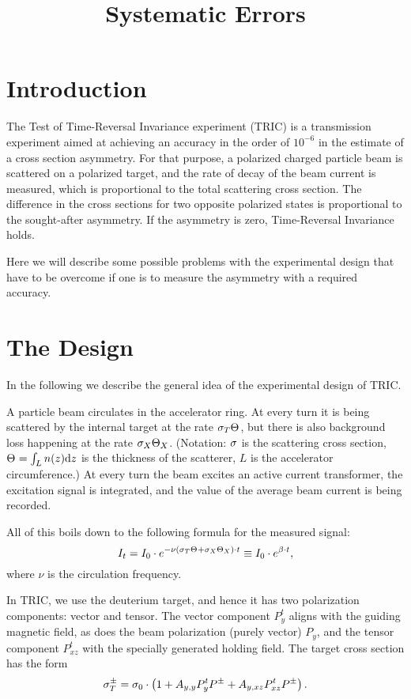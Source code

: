 \documentclass{article}
\begin{document}
\title{Systematic Errors}
\maketitle

\section{Introduction}

The Test of Time-Reversal Invariance experiment (TRIC) is a transmission experiment aimed at achieving an accuracy in the order of $10^{-6}$ in the estimate of a cross section asymmetry. For that purpose, a polarized charged particle beam is scattered on a polarized target, and the rate of decay of the beam current is measured, which is proportional to the total scattering cross section. The difference in the cross sections for two opposite polarized states is proportional to the sought-after asymmetry. If the asymmetry is zero, Time-Reversal Invariance holds.

Here we will describe some possible problems with the experimental design that have to be overcome if one is to measure the asymmetry with a required accuracy.

\section{The Design}
In the following we describe the general idea of the experimental design of TRIC.

A particle beam circulates in the accelerator ring. At every turn it is being scattered by the internal target at the rate $\CS[T]\Thick$, but there is also background loss happening at the rate $\CS[X]\Thick[X]$. (Notation: $\CS$ is the scattering cross section, $\Thick = \int_L n(z)\td z$ is the thickness of the scatterer, $L$ is the accelerator circumference.) At every turn the beam excites an active current transformer, the excitation signal is integrated, and the value of the average beam current is being recorded. 

All of this boils down to the following formula for the measured signal:
\[
	I_t  = I_0 \cdot e^{-\nu\bkt{\CS[T]\Thick + \CS[X]\Thick[X]}\cdot t} \equiv I_0\cdot e^{\slp\cdot t},
\]
where $\nu$ is the circulation frequency.

In TRIC, we use the deuterium target, and hence it has two polarization components: vector and tensor. The vector component $P^t_y$ aligns with the guiding magnetic field, as does the beam polarization (purely vector) $P_y$, and the tensor component $P^t_{xz}$ with the specially generated holding field.  The target cross section has the form
\begin{equation}\label{eq:CrossSection}
	\CS[T]^\pm = \CS[0]\cdot\bkt{1 + \Ayy P^t_y P^\pm + \Ayxz P^t_{xz} P^\pm}.
\end{equation}
\end{document}
